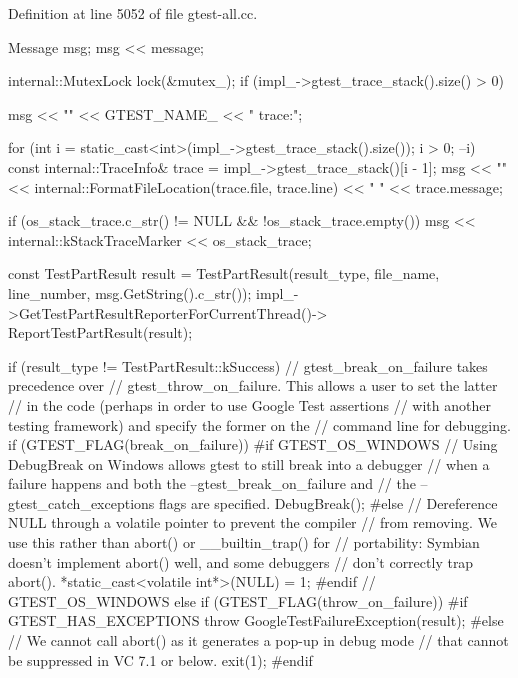 \-Definition at line 5052 of file gtest-\/all.\-cc.


\begin{DoxyCode}
                                                                       {
  Message msg;
  msg << message;

  internal::MutexLock lock(&mutex_);
  if (impl_->gtest_trace_stack().size() > 0) {
    msg << "\n" << GTEST_NAME_ << " trace:";

    for (int i = static_cast<int>(impl_->gtest_trace_stack().size());
         i > 0; --i) {
      const internal::TraceInfo& trace = impl_->gtest_trace_stack()[i - 1];
      msg << "\n" << internal::FormatFileLocation(trace.file, trace.line)
          << " " << trace.message;
    }
  }

  if (os_stack_trace.c_str() != NULL && !os_stack_trace.empty()) {
    msg << internal::kStackTraceMarker << os_stack_trace;
  }

  const TestPartResult result =
    TestPartResult(result_type, file_name, line_number,
                   msg.GetString().c_str());
  impl_->GetTestPartResultReporterForCurrentThread()->
      ReportTestPartResult(result);

  if (result_type != TestPartResult::kSuccess) {
    // gtest_break_on_failure takes precedence over
    // gtest_throw_on_failure.  This allows a user to set the latter
    // in the code (perhaps in order to use Google Test assertions
    // with another testing framework) and specify the former on the
    // command line for debugging.
    if (GTEST_FLAG(break_on_failure)) {
#if GTEST_OS_WINDOWS
      // Using DebugBreak on Windows allows gtest to still break into a
       debugger
      // when a failure happens and both the --gtest_break_on_failure and
      // the --gtest_catch_exceptions flags are specified.
      DebugBreak();
#else
      // Dereference NULL through a volatile pointer to prevent the compiler
      // from removing. We use this rather than abort() or __builtin_trap() for
      // portability: Symbian doesn't implement abort() well, and some
       debuggers
      // don't correctly trap abort().
      *static_cast<volatile int*>(NULL) = 1;
#endif  // GTEST_OS_WINDOWS
    } else if (GTEST_FLAG(throw_on_failure)) {
#if GTEST_HAS_EXCEPTIONS
      throw GoogleTestFailureException(result);
#else
      // We cannot call abort() as it generates a pop-up in debug mode
      // that cannot be suppressed in VC 7.1 or below.
      exit(1);
#endif
    }
  }
}
\end{DoxyCode}
